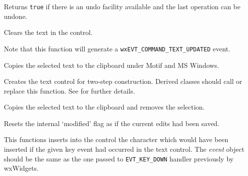 Returns {\tt true} if there is an undo facility available and the last operation
can be undone.


\label{wxtextctrlclear}


Clears the text in the control.

Note that this function will generate a {\tt wxEVT\_COMMAND\_TEXT\_UPDATED}
event.


\label{wxtextctrlcopy}


Copies the selected text to the clipboard under Motif and MS Windows.


\label{wxtextctrlcreate}


Creates the text control for two-step construction. Derived classes
should call or replace this function. See \rtfsp
for further details.


\label{wxtextctrlcut}


Copies the selected text to the clipboard and removes the selection.


\label{wxtextctrldiscardedits}


Resets the internal `modified' flag as if the current edits had been saved.


\label{wxtextctrlemulatekeypress}


This functions inserts into the control the character which would have been
inserted if the given key event had occurred in the text control. The
{\it event} object should be the same as the one passed to {\tt EVT\_KEY\_DOWN}
handler previously by wxWidgets.


